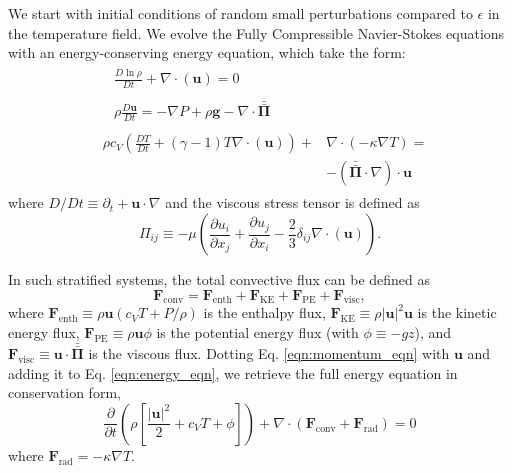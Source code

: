 \documentclass[aps, prl, twocolumn, groupedaddress]{revtex4-1}
\newcommand{\Div}[1]{\ensuremath{\nabla\cdot\left( #1\right)}}
\newcommand{\grad}{\ensuremath{\nabla}}
\newcommand{\stressT}{\ensuremath{\bm{\bar{\bar{\Pi}}}}}
\begin{document}
We start with initial conditions of random small perturbations compared to $\epsilon$ in the temperature
field.  We evolve the Fully Compressible Navier-Stokes equations with an energy-conserving energy equation,
which take the form:
\begin{align}
&\begin{aligned}
&\frac{D \ln\rho}{D t} + \Div{\bm{u}} = 0
	\label{eqn:continuity_eqn}
\end{aligned}\\
&\begin{aligned}
&\rho\frac{D\bm{u}}{D t}=
-\grad P + \rho\bm{g} - \nabla\cdot\stressT
	\label{eqn:momentum_eqn}
\end{aligned}\\
&\begin{aligned}
\rho c_V\left(\frac{D T}{D t} + (\gamma-1)T\Div{\bm{u}}\right) + &\Div{-\kappa\grad T} = \\
&-\left(\stressT\cdot\nabla\right)\cdot\bm{u} 
	\label{eqn:energy_eqn}
\end{aligned}
\end{align}
where $D/Dt \equiv \partial_t + \bm{u}\cdot\grad$ and the viscous stress tensor is defined as
\begin{equation}
\Pi_{ij} \equiv -\mu\left(\frac{\partial u_i}{\partial x_j} + \frac{\partial u_j}{\partial x_i} - \frac{2}{3}\delta_{ij}\Div{\bm{u}}\right).
	\label{eqn:stress_tensor}
\end{equation}

In such stratified systems, the total convective flux can be defined as
\begin{equation}
\bm{F}_{\text{conv}} = \bm{F}_{\text{enth}} + \bm{F}_{\text{KE}} + \bm{F}_{\text{PE}} + \bm{F}_{\text{visc}},
\end{equation}
where $\bm{F}_{\text{enth}} \equiv \rho\bm{u}(c_V T + P/\rho)$ is the enthalpy flux, $\bm{F}_{\text{KE}} \equiv 
\rho|\bm{u}|^2\bm{u}$ is the kinetic energy flux, $\bm{F}_{\text{PE}} \equiv \rho\bm{u}\phi$ is the potential
energy flux (with $\phi \equiv -gz$), 
and $\bm{F}_{\text{visc}} \equiv \bm{u}\cdot\stressT$ is the viscous flux.  Dotting 
Eq. \ref{eqn:momentum_eqn} with $\bm{u}$ and adding it to 
Eq. \ref{eqn:energy_eqn}, we retrieve the full energy equation in conservation form,
\begin{equation}
\frac{\partial}{\partial t}\left(\rho\left[\frac{|\bm{u}|^2}{2} + c_V T + \phi\right]\right) +
\Div{\bm{F}_{\text{conv}} + \bm{F}_{\text{rad}}} = 0
	\label{eqn:energy_eqn_full}
\end{equation}
where $\bm{F}_{\text{rad}} = -\kappa \grad T$. 
\end{document}
